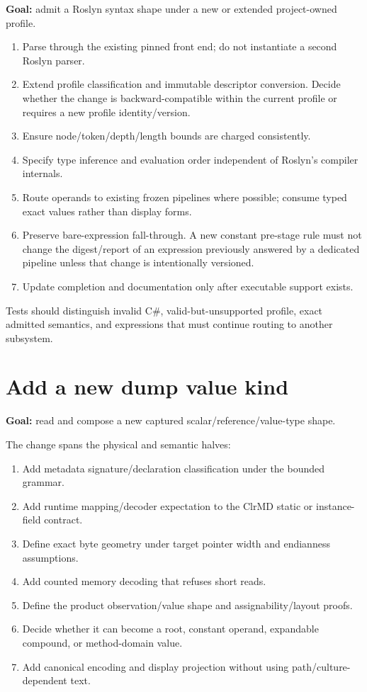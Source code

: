 \documentclass[11pt,oneside,openany]{book}
\begin{document}
\begin{recipebox}
\textbf{Goal:} admit a Roslyn syntax shape under a new or extended project-owned profile.
\end{recipebox}

\begin{enumerate}
  \item Parse through the existing pinned front end; do not instantiate a second Roslyn parser.
  \item Extend profile classification and immutable descriptor conversion. Decide whether the change is backward-compatible within the current profile or requires a new profile identity/version.
  \item Ensure node/token/depth/length bounds are charged consistently.
  \item Specify type inference and evaluation order independent of Roslyn's compiler internals.
  \item Route operands to existing frozen pipelines where possible; consume typed exact values rather than display forms.
  \item Preserve bare-expression fall-through. A new constant pre-stage rule must not change the digest/report of an expression previously answered by a dedicated pipeline unless that change is intentionally versioned.
  \item Update completion and documentation only after executable support exists.
\end{enumerate}

Tests should distinguish invalid C\#, valid-but-unsupported profile, exact admitted semantics, and expressions that must continue routing to another subsystem.

\section{Add a new dump value kind}

\begin{recipebox}
\textbf{Goal:} read and compose a new captured scalar/reference/value-type shape.
\end{recipebox}

The change spans the physical and semantic halves:

\begin{enumerate}
  \item Add metadata signature/declaration classification under the bounded grammar.
  \item Add runtime mapping/decoder expectation to the ClrMD static or instance-field contract.
  \item Define exact byte geometry under target pointer width and endianness assumptions.
  \item Add counted memory decoding that refuses short reads.
  \item Define the product observation/value shape and assignability/layout proofs.
  \item Decide whether it can become a root, constant operand, expandable compound, or method-domain value.
  \item Add canonical encoding and display projection without using path/culture-dependent text.
\end{enumerate}
\end{document}
